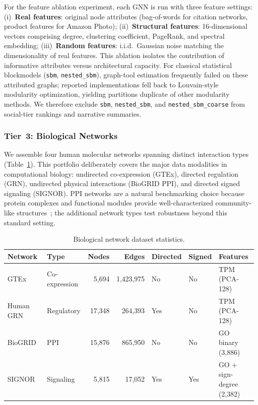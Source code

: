 \documentclass[11pt]{article}
\begin{document}
For the feature ablation experiment, each GNN is run with three feature settings:
(i)~\textbf{Real features}: original node attributes (bag-of-words for citation networks, product features for Amazon Photo);
(ii)~\textbf{Structural features}: 16-dimensional vectors comprising degree, clustering coefficient, PageRank, and spectral embedding;
(iii)~\textbf{Random features}: i.i.d.\ Gaussian noise matching the dimensionality of real features.
This ablation isolates the contribution of informative attributes versus architectural capacity.
For classical statistical blockmodels (\texttt{sbm}, \texttt{nested\_sbm}), graph-tool estimation frequently failed on these attributed graphs; reported implementations fell back to Louvain-style modularity optimization, yielding partitions duplicate of other modularity methods.
We therefore exclude \texttt{sbm}, \texttt{nested\_sbm}, and \texttt{nested\_sbm\_coarse} from social-tier rankings and narrative summaries.

\subsubsection{Tier~3: Biological Networks}

We assemble four human molecular networks spanning distinct interaction types (Table~\ref{tab:bio_datasets}).
This portfolio deliberately covers the major data modalities in computational biology: undirected co-expression (GTEx), directed regulation (GRN), undirected physical interactions (BioGRID PPI), and directed signed signaling (SIGNOR).
PPI networks are a natural benchmarking choice because protein complexes and functional modules provide well-characterized community-like structures~\citep{choobdar_dream_2019}; the additional network types test robustness beyond this standard setting.

\begin{table}[h]
\centering
\caption{Biological network dataset statistics.}
\label{tab:bio_datasets}
\small
\begin{tabular}{llrrlll}
\toprule
\textbf{Network} & \textbf{Type} & \textbf{Nodes} & \textbf{Edges} & \textbf{Directed} & \textbf{Signed} & \textbf{Features} \\
\midrule
GTEx~\citep{gtex_2020} & Co-expression & 5{,}694 & 1{,}423{,}975 & No & No & TPM (PCA-128) \\
Human GRN & Regulatory & 17{,}348 & 264{,}393 & Yes & No & TPM (PCA-128) \\
BioGRID~\citep{biogrid_2023} & PPI & 15{,}876 & 865{,}950 & No & No & GO binary (3{,}886) \\
SIGNOR~\citep{signor_2020} & Signaling & 5{,}815 & 17{,}052 & Yes & Yes & GO + sign-degree (2{,}382) \\
\bottomrule
\end{tabular}
\end{table}
\end{document}
